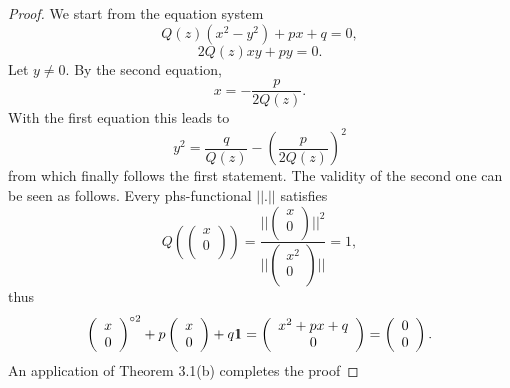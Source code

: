 \documentclass{amsart}
\theoremstyle{definition}
\theoremstyle{remark}
\numberwithin{equation}{section}
\begin{document}
\begin{proof}We start from the equation system
\begin{equation}
Q(z)(x^2-y^2)+px+q=0,
\end{equation}
\begin{equation}
2Q(z)xy+py=0.
\end{equation}
Let $y\neq 0$. By the second equation,
\[x=-\frac{p}{2Q(z)}.\]
With the first equation this leads to
\[y^2=\frac{q}{Q(z)}-(\frac{p}{2Q(z)})^2\]
from which finally follows the first statement. The validity of the second one can be seen as follows. Every phs-functional $||.||$ satisfies
\[Q(\left(
      \begin{array}{c}
        x \\
        0 \\
      \end{array}
    \right))=\frac{||\left(
                      \begin{array}{c}
                        x \\
                        0 \\
                      \end{array}
                    \right)
    ||^2}{||\left(
                      \begin{array}{c}
                        x^2 \\
                        0 \\
                      \end{array}
                    \right)
    ||}=1,
\] thus
\[
\left(
  \begin{array}{c}
    x \\
    0 \\
  \end{array}
\right)^{\circ 2}+p\left(
  \begin{array}{c}
    x \\
    0 \\
  \end{array}
\right)+q1\hspace{-.15cm}1=\left(
  \begin{array}{c}
    x^2+px+q \\
    0 \\
  \end{array}
\right)=\left(
          \begin{array}{c}
            0 \\
            0 \\
          \end{array}
        \right).
\]An application of Theorem 3.1(b) completes the proof
\end{proof}
\end{document}
